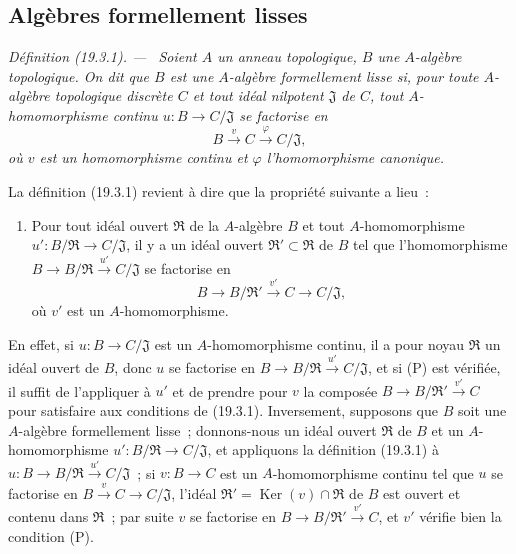 \documentclass[10pt,oneside]{book}
\makeatletter
\newcommand{\setmanualcurrentlabel}[1]{\def\@currentlabel{#1}}
\newcommand{\oldpage}[2][]{%
  \setcounter{footnote}{0}%
  \marginpar{\scriptsize\textbf{#1}~|~#2}\ignorespaces}
\newenvironment{definition}[1][]{%
  \setmanualcurrentlabel{#1}\par\medskip\noindent\itshape Définition (#1). ---\ }{\par}
\makeatother
\begin{document}
\subsection{Algèbres formellement lisses}
\label{subsection:0.19.3-fr}

\begin{definition}[19.3.1]
\label{0.19.3.1-fr}
Soient $A$ un anneau topologique, $B$ une $A$-algèbre topologique. On dit que
$B$ est une $A$-algèbre \emph{formellement lisse} si, pour toute
$A$-algèbre topologique discrète $C$ et tout idéal nilpotent $\mathfrak J$ de
$C$, tout $A$-homomorphisme continu $u:B\to C/\mathfrak J$ se factorise en
\[
  B\xrightarrow{v}C\xrightarrow{\varphi}C/\mathfrak J,
\]
où $v$ est un homomorphisme continu et $\varphi$ l'homomorphisme canonique.
\end{definition}

\oldpage[0\textsubscript{IV-1}]{80}

La définition (19.3.1) revient à dire que la propriété suivante a lieu~:
\begin{enumerate}
  \item[(P)] Pour tout idéal ouvert $\mathfrak R$ de la $A$-algèbre $B$ et
  tout $A$-homomorphisme $u':B/\mathfrak R\to C/\mathfrak J$, il y a un
  idéal ouvert $\mathfrak R'\subset\mathfrak R$ de $B$ tel que
  l'homomorphisme
  $B\to B/\mathfrak R\xrightarrow{u'}C/\mathfrak J$ se factorise en
  \[
    B\to B/\mathfrak R'\xrightarrow{v'}C\to C/\mathfrak J,
  \]
  où $v'$ est un $A$-homomorphisme.
\end{enumerate}
En effet, si $u:B\to C/\mathfrak J$ est un $A$-homomorphisme continu, il a
pour noyau $\mathfrak R$ un idéal ouvert de $B$, donc $u$ se factorise en
$B\to B/\mathfrak R\xrightarrow{u'}C/\mathfrak J$, et si (P) est
vérifiée, il suffit de l'appliquer à $u'$ et de prendre pour $v$ la composée
$B\to B/\mathfrak R'\xrightarrow{v'}C$ pour satisfaire aux conditions de
(19.3.1). Inversement, supposons que $B$ soit une $A$-algèbre formellement
lisse~; donnons-nous un idéal ouvert $\mathfrak R$ de $B$ et un
$A$-homomorphisme $u':B/\mathfrak R\to C/\mathfrak J$, et appliquons la
définition (19.3.1) à
$u:B\to B/\mathfrak R\xrightarrow{u'}C/\mathfrak J$~; si
$v:B\to C$ est un $A$-homomorphisme continu tel que $u$ se factorise en
$B\xrightarrow{v}C\to C/\mathfrak J$, l'idéal
$\mathfrak R'=\operatorname{Ker}(v)\cap\mathfrak R$ de $B$ est ouvert et
contenu dans $\mathfrak R$~; par suite $v$ se factorise en
$B\to B/\mathfrak R'\xrightarrow{v'}C$, et $v'$ vérifie bien la condition
(P).
\end{document}
